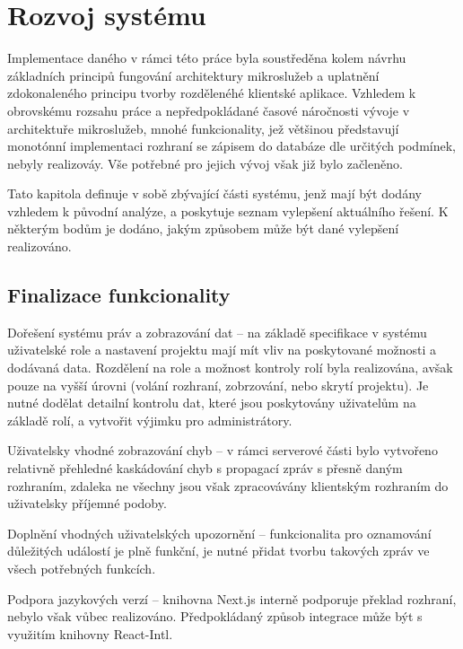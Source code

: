 \chapter{Rozvoj systému}\label{ch:improvements}


Implementace daného  v rámci této práce byla soustředěna kolem návrhu základních principů fungování architektury mikroslužeb a uplatnění zdokonaleného principu tvorby rozdělenéhé klientské aplikace.
Vzhledem k obrovskému rozsahu práce a nepředpokládané časové náročnosti vývoje v architektuře mikroslužeb, mnohé funkcionality, jež většinou představují monotónní implementaci  rozhraní se zápisem do databáze dle určitých podmínek, nebyly realizováy.
Vše potřebné pro jejich vývoj však již bylo začleněno.

Tato kapitola definuje v sobě zbývající části systému, jenž mají být dodány vzhledem k původní analýze, a poskytuje seznam vylepšení aktuálního řešení.
K některým bodům je dodáno, jakým způsobem může být dané vylepšení realizováno.

\newpage



\section{Finalizace funkcionality}\label{sec:unimplemented}

\begin{dl}
   \item[Dořešení systému práv a zobrazování dat] – na základě specifikace v systému uživatelské role a nastavení projektu mají mít vliv na poskytované možnosti a dodávaná data.
   Rozdělení na role a možnost kontroly rolí byla realizována, avšak pouze na vyšší úrovni (volání rozhraní, zobrzování, nebo skrytí projektu).
   Je nutné dodělat detailní kontrolu dat, které jsou poskytovány uživatelům na základě rolí, a vytvořit výjimku pro administrátory.
   \item[Uživatelsky vhodné zobrazování chyb] – v rámci serverové části bylo vytvořeno relativně přehledné kaskádování chyb s propagací zpráv s přesně daným rozhraním, zdaleka ne všechny jsou však zpracovávány klientským rozhraním do uživatelsky příjemné podoby.
   \item[Doplnění vhodných uživatelských upozornění] – funkcionalita pro oznamování důležitých událostí je plně funkční, je nutné přidat tvorbu takových zpráv ve všech potřebných funkcích.
   \item[Podpora jazykových verzí] – knihovna Next.js interně podporuje překlad rozhraní, nebylo však vůbec realizováno.
   Předpokládaný způsob integrace může být s využitím knihovny React-Intl.
\end{dl}

